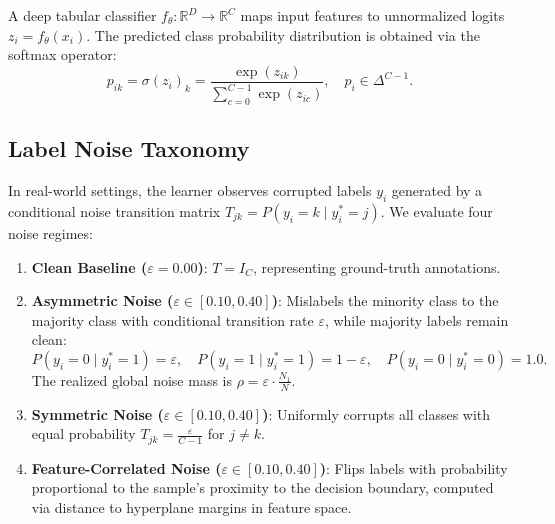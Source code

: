 \documentclass[preprint,12pt]{elsarticle}
\begin{document}
A deep tabular classifier $f_\theta: \mathbb{R}^D \to \mathbb{R}^C$ maps input features to unnormalized logits $z_i = f_\theta(x_i)$. The predicted class probability distribution is obtained via the softmax operator:
\begin{equation}
p_{ik} = \sigma(z_i)_k = \frac{\exp(z_{ik})}{\sum_{c=0}^{C-1} \exp(z_{ic})}, \quad p_i \in \Delta^{C-1}.
\end{equation}

\subsection{Label Noise Taxonomy}
In real-world settings, the learner observes corrupted labels $y_i$ generated by a conditional noise transition matrix $T_{jk} = P(y_i = k \mid y_i^* = j)$. We evaluate four noise regimes:
\begin{enumerate}
    \item \textbf{Clean Baseline ($\varepsilon = 0.00$)}: $T = I_C$, representing ground-truth annotations.
    \item \textbf{Asymmetric Noise ($\varepsilon \in [0.10, 0.40]$)}: Mislabels the minority class to the majority class with conditional transition rate $\varepsilon$, while majority labels remain clean:
    \begin{equation}
    P(y_i = 0 \mid y_i^* = 1) = \varepsilon, \quad P(y_i = 1 \mid y_i^* = 1) = 1 - \varepsilon, \quad P(y_i = 0 \mid y_i^* = 0) = 1.0.
    \end{equation}
    The realized global noise mass is $\rho = \varepsilon \cdot \frac{N_1}{N}$.
    \item \textbf{Symmetric Noise ($\varepsilon \in [0.10, 0.40]$)}: Uniformly corrupts all classes with equal probability $T_{jk} = \frac{\varepsilon}{C-1}$ for $j \neq k$.
    \item \textbf{Feature-Correlated Noise ($\varepsilon \in [0.10, 0.40]$)}: Flips labels with probability proportional to the sample's proximity to the decision boundary, computed via distance to hyperplane margins in feature space.
\end{enumerate}
\end{document}

